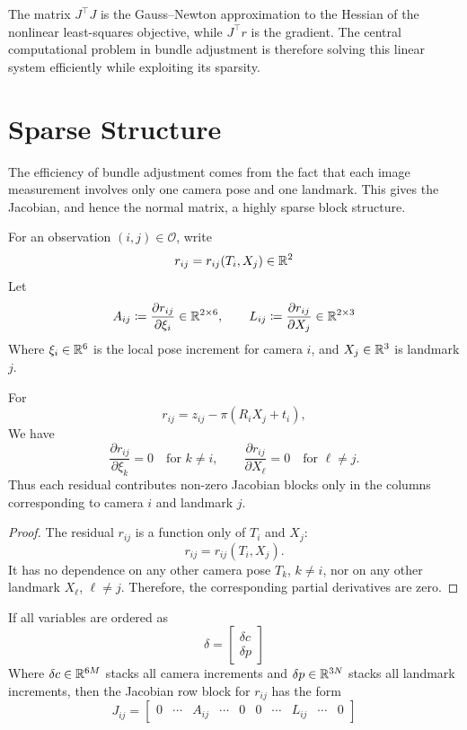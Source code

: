 \documentclass[11pt]{article}
\begin{document}
\begin{remark}
The matrix \(J^\top J\) is the Gauss--Newton approximation to the Hessian of the nonlinear least-squares objective, while \(J^\top r\) is the gradient. The central computational problem in bundle adjustment is therefore solving this linear system efficiently while exploiting its sparsity.
\end{remark}

\section{Sparse Structure}

The efficiency of bundle adjustment comes from the fact that each image measurement involves only one camera pose and one landmark. This gives the Jacobian, and hence the normal matrix, a highly sparse block structure.

\begin{definition}
For an observation \((i,j)\in\mathcal O\), write
\[
r_{ij}=r_{ij}(T_i,X_j)\in\mathbb{R}^2
\]
Let
\[
A_{ij}\coloneqq \frac{\partial r_{ij}}{\partial \xi_i}\in\mathbb{R}^{2\times 6},
\qquad
L_{ij}\coloneqq \frac{\partial r_{ij}}{\partial X_j}\in\mathbb{R}^{2\times 3}
\]
Where \(\xi_i\in\mathbb{R}^6\) is the local pose increment for camera \(i\), and \(X_j\in\mathbb{R}^3\) is landmark \(j\).
\end{definition}

\begin{proposition}
For
\[
r_{ij}=z_{ij}-\pi(R_iX_j+t_i),
\]
We have
\[
\frac{\partial r_{ij}}{\partial \xi_k}=0
\quad\text{for } k\neq i,
\qquad
\frac{\partial r_{ij}}{\partial X_\ell}=0
\quad\text{for } \ell\neq j.
\]
Thus each residual contributes non-zero Jacobian blocks only in the columns corresponding to camera \(i\) and landmark \(j\).
\end{proposition}

\begin{proof}
The residual \(r_{ij}\) is a function only of \(T_i\) and \(X_j\):
\[
r_{ij}=r_{ij}(T_i,X_j).
\]
It has no dependence on any other camera pose \(T_k\), \(k\neq i\), nor on any other landmark \(X_\ell\), \(\ell\neq j\). Therefore, the corresponding partial derivatives are zero.
\end{proof}

\begin{remark}
If all variables are ordered as
\[
\delta=
\begin{bmatrix}
\delta c\\
\delta p
\end{bmatrix}
\]
Where \(\delta c\in\mathbb{R}^{6M}\) stacks all camera increments and \(\delta p\in\mathbb{R}^{3N}\) stacks all landmark increments, then the Jacobian row block for \(r_{ij}\) has the form
\[
J_{ij}
=
\begin{bmatrix}
0 & \cdots & A_{ij} & \cdots & 0
&
0 & \cdots & L_{ij} & \cdots & 0
\end{bmatrix}
\]
\end{remark}
\end{document}
